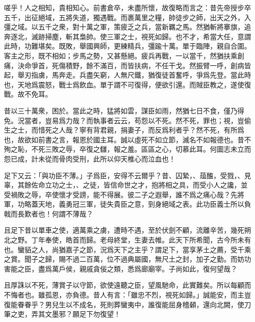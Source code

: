 嗟乎！人之相知，貴相知心。前書倉卒，未盡所懷，故復略而言之：昔先帝授步卒五千，出征絕域，五將失道，獨遇戰。而裹萬里之糧，帥徒步之師，出天之外，入彊之域。以五千之衆，對十萬之軍，策疲乏之兵，當新羈之馬。然猶斬將搴旗，追奔逐北，滅跡掃塵，斬其梟帥。使三軍之士，視死如歸。也不才，希當大任，意謂此時，功難堪矣。既敗，舉國興師，更練精兵，彊踰十萬。單于臨陣，親自合圍。客主之形，既不相如；步馬之勢，又甚懸絕。疲兵再戰，一以當千，然猶扶乘創痛，決命爭首，死傷積野，餘不滿百，而皆扶病，不任干戈。然振臂一呼，創病皆起，舉刃指虜，馬奔走。兵盡矢窮，人無尺鐵，猶復徒首奮呼，爭爲先登。當此時也，天地爲震怒，戰士爲飲血。單于謂不可復得，便欲引還。而賊臣教之，遂使復戰。故不免耳。

昔以三十萬衆，困於。當此之時，猛將如雲，謀臣如雨，然猶七日不食，僅乃得免。況當者，豈易爲力哉？而執事者云云，苟怨以不死。然不死，罪也；視，豈偷生之士，而惜死之人哉？寧有背君親，捐妻子，而反爲利者乎？然不死，有所爲也，故欲如前書之言，報恩於國主耳。誠以虛死不如立節，滅名不如報德也。昔不殉之恥，不死三敗之辱，卒復之讎，報之羞。區區之心，切慕此耳。何圖志未立而怨已成，計未從而骨肉受刑，此所以仰天椎心而泣血也！

足下又云：「與功臣不薄。」子爲臣，安得不云爾乎？昔、囚縶，、葅醢，受戮，、見辜，其餘佐命立功之士，、之徒，皆信命世之才，抱將相之具，而受小人之讒，並受禍敗之辱，卒使懷才受謗，能不得展。彼二子之遐舉，誰不爲之痛心哉？先將軍，功略蓋天地，義勇冠三軍，徒失貴臣之意，剄身絕域之表。此功臣義士所以負戟而長歎者也！何謂不薄哉？

且足下昔以單車之使，適萬乘之虜，遭時不遇，至於伏劍不顧，流離辛苦，幾死朔北之野。丁年奉使，皓首而歸。老母終堂，生妻去帷。此天下所希聞，古今所未有也。蠻貊之人，尚猶嘉子之節，況爲天下之主乎？謂足下，當享茅土之薦，受千乘之賞。聞子之歸，賜不過二百萬，位不過典屬國，無尺土之封，加子之勤。而妨功害能之臣，盡爲萬戶侯，親戚貪佞之類，悉爲廊廟宰。子尚如此，復何望哉？

且厚誅以不死，薄賞子以守節，欲使遠聽之臣，望風馳命，此實難矣。所以每顧而不悔者也。雖孤恩，亦負德。昔人有言：「雖忠不烈，視死如歸。」誠能安，而主豈復能眷眷乎？男兒生以不成名，死則葬蠻夷中，誰復能屈身稽顙，還向北闕，使刀筆之吏，弄其文墨邪？願足下勿復望！

